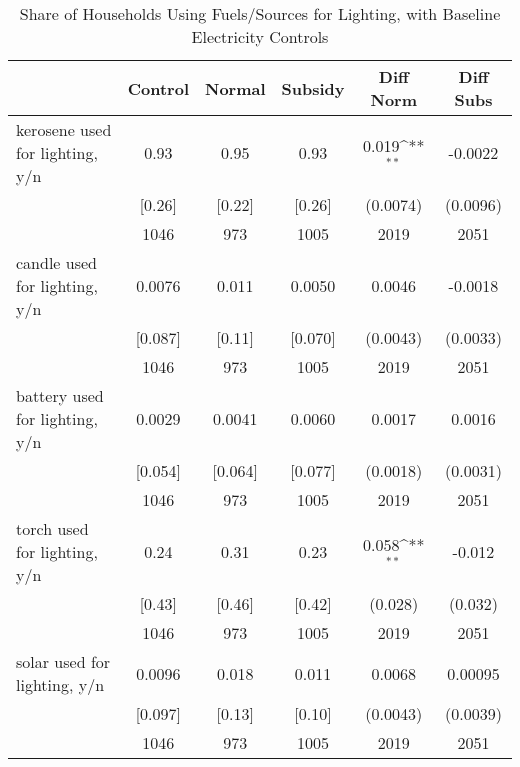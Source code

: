 \begin{table}[htbp]\centering
\def\sym#1{\ifmmode^{#1}\else\(^{#1}\)\fi}
\caption{Share of Households Using Fuels/Sources for Lighting, with Baseline Electricity Controls \label{tab:"balance"}}
\begin{tabular*}{0.9\hsize}{@{\hskip\tabcolsep\extracolsep\fill}l*{1}{ccccc}}
\toprule
                                &  Control&   Normal&  Subsidy&Diff Norm         &Diff Subs         \\
\midrule
kerosene used for lighting, y/n &     0.93&     0.95&     0.93&    0.019\sym{**} &  -0.0022         \\
                                &   [0.26]&   [0.22]&   [0.26]& (0.0074)         & (0.0096)         \\
                                &     1046&      973&     1005&     2019         &     2051         \\
candle used for lighting, y/n   &   0.0076&    0.011&   0.0050&   0.0046         &  -0.0018         \\
                                &  [0.087]&   [0.11]&  [0.070]& (0.0043)         & (0.0033)         \\
                                &     1046&      973&     1005&     2019         &     2051         \\
battery used for lighting, y/n  &   0.0029&   0.0041&   0.0060&   0.0017         &   0.0016         \\
                                &  [0.054]&  [0.064]&  [0.077]& (0.0018)         & (0.0031)         \\
                                &     1046&      973&     1005&     2019         &     2051         \\
torch used for lighting, y/n    &     0.24&     0.31&     0.23&    0.058\sym{**} &   -0.012         \\
                                &   [0.43]&   [0.46]&   [0.42]&  (0.028)         &  (0.032)         \\
                                &     1046&      973&     1005&     2019         &     2051         \\
solar used for lighting, y/n    &   0.0096&    0.018&    0.011&   0.0068         &  0.00095         \\
                                &  [0.097]&   [0.13]&   [0.10]& (0.0043)         & (0.0039)         \\
                                &     1046&      973&     1005&     2019         &     2051         \\

\end{tabular*}
\end{table}
